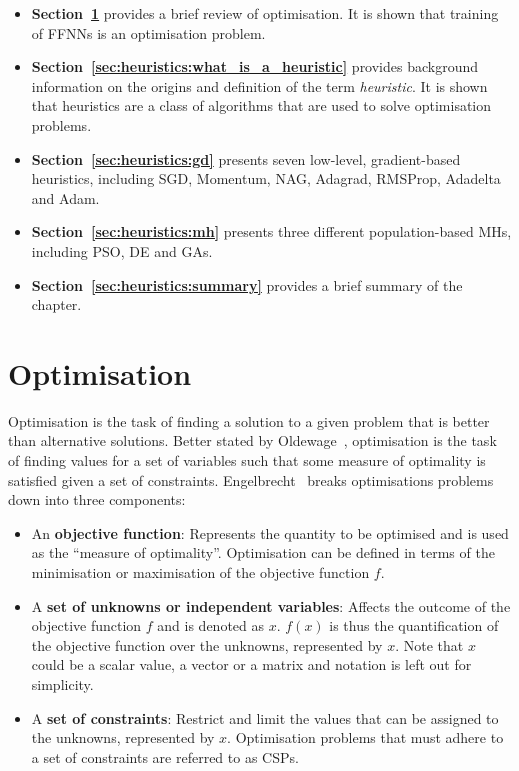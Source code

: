 \begin{itemize}
      \item \textbf{Section~\ref{sec:heuristics:optimisation}} provides a brief review of optimisation. It is shown that training of \acp{FFNN} is an optimisation problem.

      \item \textbf{Section~\ref{sec:heuristics:what_is_a_heuristic}} provides background information on the origins and definition of the term \textit{heuristic}. It is shown that heuristics are a class of algorithms that are used to solve optimisation problems.

      \item \textbf{Section~\ref{sec:heuristics:gd}} presents seven low-level, gradient-based heuristics, including \acf{SGD}, \acf{Momentum}, \acf{NAG}, \acf{Adagrad}, \acf{RMSProp}, \acf{Adadelta} and \acf{Adam}.

      \item \textbf{Section~\ref{sec:heuristics:mh}} presents three different population-based \acp{MH}, including \acf{PSO}, \acf{DE} and \acfp{GA}.

      \item \textbf{Section~\ref{sec:heuristics:summary}} provides a brief summary of the chapter.
\end{itemize}

\section{Optimisation}\label{sec:heuristics:optimisation}

Optimisation is the task of finding a solution to a given problem that is better than alternative solutions. Better stated by Oldewage~\cite{ref:oldewage:2017}, optimisation is the task of finding values for a set of variables such that some measure of optimality is satisfied given a set of constraints. Engelbrecht~\cite{ref:engelbrecht:2007} breaks optimisations problems down into three components:

\begin{itemize}
      \item An \textbf{objective function}: Represents the quantity to be optimised and is used as the ``measure of optimality''. Optimisation can be defined in terms of the minimisation or maximisation of the objective function $f$.

      \item A \textbf{set of unknowns or independent variables}: Affects the outcome of the objective function $f$ and is denoted as $x$. $f(x)$ is thus the quantification of the objective function over the unknowns, represented by $x$. Note that $x$ could be a scalar value, a vector or a matrix and notation is left out for simplicity.

      \item A \textbf{set of constraints}: Restrict and limit the values that can be assigned to the unknowns, represented by $x$. Optimisation problems that must adhere to a set of constraints are referred to as \acfp{CSP}.
\end{itemize}

